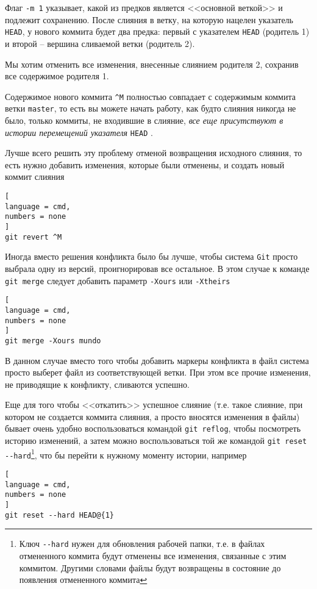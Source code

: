 \documentclass[%
	11pt,
	a4paper,
	utf8,
		]{article}
\begin{document}
Флаг \texttt{-m 1} указывает, какой из предков является <<основной веткой>> и подлежит сохранению. После слияния в ветку, на которую нацелен указатель \texttt{HEAD}, у нового коммита будет два предка: первый с указателем \texttt{HEAD} (родитель 1) и второй -- вершина сливаемой ветки (родитель 2).

Мы хотим отменить все изменения, внесенные слиянием родителя 2, сохранив все содержимое родителя 1.

Содержимое нового коммита \verb|^M| полностью совпадает с содержимым коммита ветки \texttt{master}, то есть вы можете начать работу, как будто слияния никогда не было, только коммиты, не входившие в слияние, \emph{все еще присутствуют в истории перемещений указателя} \texttt{HEAD} \cite[]{chacon:2020}.

Лучше всего решить эту проблему отменой возвращения исходного слияния, то есть нужно добавить изменения, которые были отменены, и создать новый коммит слияния
\begin{lstlisting}[
language = cmd,
numbers = none
]
git revert ^M
\end{lstlisting}

Иногда вместо решения конфликта было бы лучше, чтобы система \texttt{Git} просто выбрала одну из версий, проигнорировав все остальное. В этом случае к команде \texttt{git merge} следует добавить параметр \texttt{-Xours} или \texttt{-Xtheirs}
\begin{lstlisting}[
language = cmd,
numbers = none
]
git merge -Xours mundo
\end{lstlisting}

В данном случае вместо того чтобы добавить маркеры конфликта в файл система просто выберет файл из соответствующей ветки. При этом все прочие изменения, не приводящие к конфликту, сливаются успешно.

Еще для того чтобы <<откатить>> успешное слияние (т.е. такое слияние, при котором не создается коммита слияния, а просто вносятся изменения в файлы) бывает очень удобно воспользоваться командой \texttt{git reflog}, чтобы посмотреть историю изменений, а затем можно воспользоваться той же командой \verb|git reset --hard|\footnote{Ключ \texttt{-}\texttt{-hard} нужен для обновления рабочей папки, т.е. в файлах отмененного коммита будут отменены все изменения, связанные с этим коммитом. Другими словами файлы будут возвращены в состояние до появления отмененного коммита}, что бы перейти к нужному моменту истории, например
\begin{lstlisting}[
language = cmd,
numbers = none
]
git reset --hard HEAD@{1}
\end{lstlisting}
\end{document}
